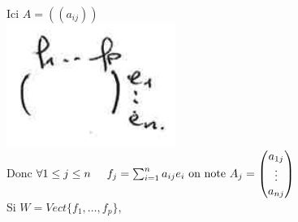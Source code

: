 \documentclass{article}
\newcommand\tab[1][1cm]{\hspace*{#1}}
\begin{document}
Ici $A = ((a_{ij}))$\\ \includegraphics{images/image01.png}\\
Donc $\forall 1 \leq j \leq n \tab[0.5cm] f_j = \sum_{i =1}^n a_{ij} e_i \mbox{ on note } A_j = \begin{pmatrix}
    a_{1j}\\
    \vdots\\
    a_{nj}\\
\end{pmatrix}$\\
Si $W = Vect\{f_1, \dots, f_p\}$,
\end{document}
